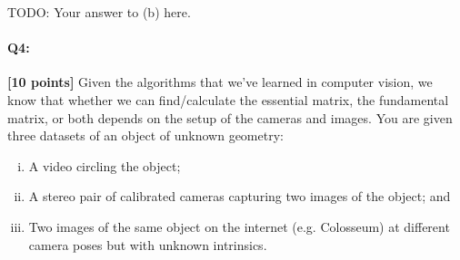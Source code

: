 \begin{enumerate}[(a)]
\begin{enumerate} [(a)]
\begin{tcolorbox}[colback=white!5!white,colframe=green!75!black]
{{    TODO: Your answer to (b) here.

    }}
\end{tcolorbox}

\end{enumerate}

\end{enumerate}







\pagebreak
\paragraph{Q4:} \textbf{[10 points]}
Given the algorithms that we've learned in computer vision, we know that whether we can find/calculate the essential matrix, the fundamental matrix, or both depends on the setup of the cameras and images. You are given three datasets of an object of unknown geometry:

\begin{enumerate}[(i)]
\item A video circling the object;
\item A stereo pair of calibrated cameras capturing two images of the object; and
\item Two images of the same object on the internet (e.g. Colosseum) at different camera poses but with unknown intrinsics.
\end{enumerate}

